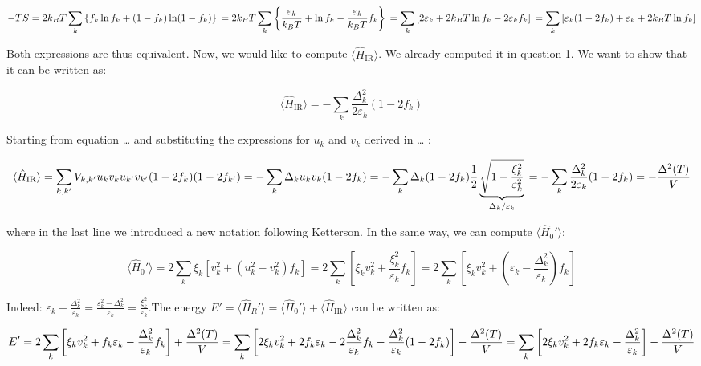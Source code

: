 \[ - TS = 2 k_B T \sum_k \left\{f_k \ln f_k + (1 - f_k)\ln(1 - f_k) \right\} \\ = 2k_B T \sum_k \left\{\frac{\varepsilon_k}{k_B T} + \ln f_k - \frac{\varepsilon_k}{k_B T}f_k \right\} \\ = \sum_k \left[2 \varepsilon_k + 2 k_B T \ln f_k - 2 \varepsilon_k f_k \right] \\ = \sum_k \left[\varepsilon_k (1 - 2 f_k) + \varepsilon_k + 2 k_B T \ln f_k \right]\]

Both expressions are thus equivalent. Now, we would like to compute
\(\langle \hat{H}_{\textrm{IR}} \rangle\). We already computed it in
question 1. We want to show that it can be written as:

\[ \langle \hat{H}_{\textrm{IR}} \rangle = - \sum_k \frac{\Delta_k^2}{2\varepsilon_k}(1 - 2 f_k)\]

Starting from equation \ldots{} and substituting the expressions for
\(u_k\) and \(v_k\) derived in \ldots{} :

\[ \langle \hat{H}_{\textrm{IR}} \rangle = \sum_{k,k'} V_{k,k'} u_k v_k u_{k'}v_{k'}(1 - 2 f_k)(1-2 f_{k'}) \\ = -\sum_k \Delta_k u_k v_k (1-2 f_k) \\ = -\sum_{k} \Delta_k (1 - 2 f_k)\frac{1}{2}\underbrace{\sqrt{1 - \frac{\xi_k^2}{\varepsilon_k^2}}}_{\Delta_k / \varepsilon_k} \\ = -\sum_k \frac{\Delta_k^2}{2\varepsilon_k}(1 - 2 f_k) \\ = -\frac{\Delta^2(T)}{V}\]

where in the last line we introduced a new notation following Ketterson.
In the same way, we can compute \(\langle \hat{H}_0'\rangle\):

\[ \langle \hat{H}_0' \rangle = 2 \sum_k \xi_k \left[v_k^2 + (u_k^2 - v_k^2)f_k \right] = 2\sum_k \left[\xi_k v_k^2 + \frac{\xi_k^2}{\varepsilon_k}f_k \right] = 2 \sum_k \left[\xi_k v_k^2 + \left(\varepsilon_k - \frac{\Delta_k^2}{\varepsilon_k}\right) f_k\right]\]

Indeed:
\(\varepsilon_k - \frac{\Delta_k^2}{\varepsilon_k} = \frac{\varepsilon_k^2 - \Delta_k^2}{\varepsilon_k} = \frac{\xi_k^2}{\varepsilon_k}\).The
energy
\(E' = \langle \hat{H}_R' \rangle = \langle \hat{H}_0' \rangle + \langle \hat{H}_{\textrm{IR}} \rangle\)
can be written as:

\[E' = 2 \sum_k \left[\xi_k v_k^2 + f_k \varepsilon_k - \frac{\Delta_k^2}{\varepsilon_k} f_k \right] + \frac{\Delta^2(T)}{V} \\ = \sum_k \left[2\xi_k v_k^2 + 2f_k \varepsilon_k - 2 \frac{\Delta_k^2}{\varepsilon_k} f_k -\frac{\Delta_k^2}{\varepsilon_k}(1-2 f_k)\right] - \frac{\Delta^2(T)}{V} \\ = \sum_k \left[2\xi_k v_k^2 + 2f_k \varepsilon_k - \frac{\Delta_k^2}{\varepsilon_k}\right] - \frac{\Delta^2(T)}{V}\]

